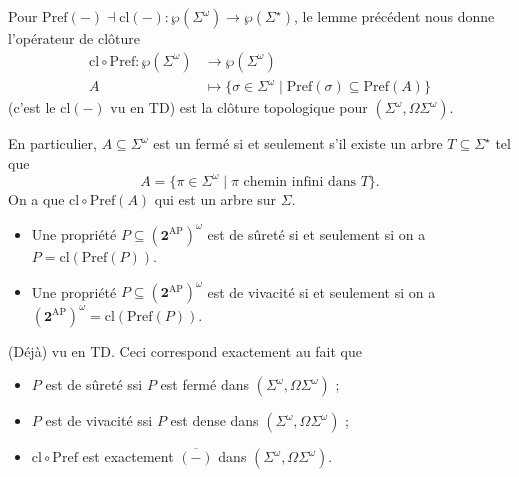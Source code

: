 \documentclass[./main]{subfiles}
\begin{document}
  \begin{exm}
    Pour $\mathrm{Pref}(-) \dashv \mathrm{cl}(-) : \wp(\Sigma^\omega) \to \wp(\Sigma^\star)$,
    le lemme précédent nous donne l'opérateur de clôture 
    \begin{align*}
      \mathrm{cl} \circ \mathrm{Pref}: \wp(\Sigma^\omega) &\longrightarrow \wp(\Sigma^\omega) \\
      A &\longmapsto \{\sigma \in \Sigma^\omega  \mid \mathrm{Pref}(\sigma) \subseteq \mathrm{Pref}(A)\} 
    \end{align*}
    (c'est le $\mathrm{cl}(-)$ vu en TD)
    est la clôture topologique pour $(\Sigma^\omega, \Omega \Sigma^\omega)$.
  \end{exm}

  \begin{rmk}
    En particulier, $A \subseteq \Sigma^\omega$ est un fermé si et seulement s'il existe un arbre $T \subseteq \Sigma^\star$ tel que \[
    A = \{\pi \in \Sigma^\omega  \mid \pi \text{ chemin infini dans } T\} 
    .\]
    On a que $\mathrm{cl} \circ \mathrm{Pref}(A)$ qui est un arbre sur $\Sigma$.
  \end{rmk}

  \begin{crlr}
    \begin{itemize}
      \item Une propriété $P \subseteq (\mathbf{2}^\mathrm{AP})^\omega$ est de sûreté si et seulement si on a $P = \mathrm{cl}(\mathrm{Pref}(P))$.
      \item Une propriété $P \subseteq (\mathbf{2}^\mathrm{AP})^\omega$ est de vivacité si et seulement si on a $(\mathbf{2}^\mathrm{AP})^\omega = \mathrm{cl}(\mathrm{Pref}(P))$.
    \end{itemize} 
  \end{crlr}
  \begin{prv}
    (Déjà) vu en TD.
    Ceci correspond exactement au fait que 
    \begin{itemize}
      \item $P$ est de sûreté ssi $P$ est fermé dans $(\Sigma^\omega, \Omega \Sigma^\omega)$ ;
      \item $P$ est de vivacité ssi $P$ est dense dans $(\Sigma^\omega, \Omega \Sigma^\omega)$ ;
      \item $\mathrm{cl} \circ \mathrm{Pref}$ est exactement $\overline{(-)}$ dans $(\Sigma^\omega, \Omega \Sigma^\omega)$.
    \end{itemize}
  \end{prv}
\end{document}
